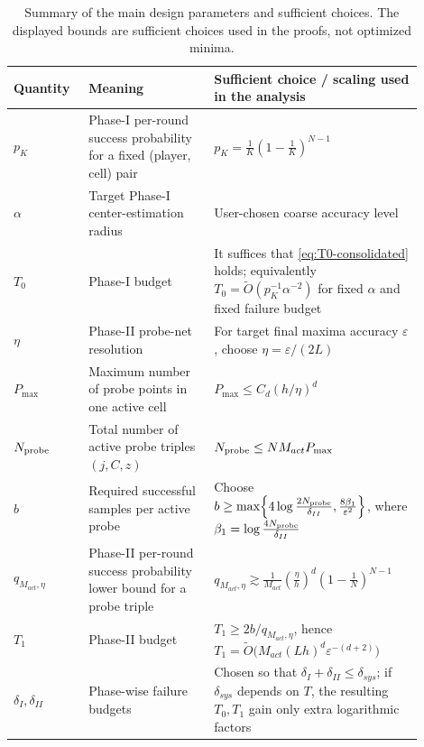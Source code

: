 \begin{table}[h]
\centering
\small
\renewcommand{\arraystretch}{1.15}
\begin{tabular}{|p{0.16\linewidth}|p{0.28\linewidth}|p{0.46\linewidth}|}
\hline
Quantity & Meaning & Sufficient choice / scaling used in the analysis \\
\hline
\(p_K\) & Phase-I per-round success probability for a fixed (player, cell) pair & \(p_K=\frac{1}{K}\left(1-\frac{1}{K}\right)^{N-1}\) \\
\hline
\(\alpha\) & Target Phase-I center-estimation radius & User-chosen coarse accuracy level \\
\hline
\(T_0\) & Phase-I budget & It suffices that \eqref{eq:T0-consolidated} holds; equivalently \(T_0=\tilde O(p_K^{-1}\alpha^{-2})\) for fixed \(\alpha\) and fixed failure budget \\
\hline
\(\eta\) & Phase-II probe-net resolution & For target final maxima accuracy \(\varepsilon\), choose \(\eta=\varepsilon/(2L)\) \\
\hline
\(P_{\max}\) & Maximum number of probe points in one active cell & \(P_{\max}\le C_d (h/\eta)^d\) \\
\hline
\(N_{\text{probe}}\) & Total number of active probe triples \((j,C,z)\) & \(N_{\text{probe}} \le N M_{act} P_{\max}\) \\
\hline
\(b\) & Required successful samples per active probe & Choose \(b \ge \max\!\left\{4\log\frac{2N_{\text{probe}}}{\delta_{II}}, \frac{8\beta_1}{\varepsilon^2}\right\}\), where \(\beta_1=\log\frac{4N_{\text{probe}}}{\delta_{II}}\) \\
\hline
\(q_{M_{act},\eta}\) & Phase-II per-round success probability lower bound for a probe triple & \(q_{M_{act},\eta} \gtrsim \frac{1}{M_{act}}\left(\frac{\eta}{h}\right)^d \left(1-\frac{1}{N}\right)^{N-1}\) \\
\hline
\(T_1\) & Phase-II budget & \(T_1 \ge 2b/q_{M_{act},\eta}\), hence \(T_1=\tilde O\!\big(M_{act}(Lh)^d\varepsilon^{-(d+2)}\big)\) \\
\hline
\(\delta_I,\delta_{II}\) & Phase-wise failure budgets & Chosen so that \(\delta_I+\delta_{II}\le \delta_{sys}\); if \(\delta_{sys}\) depends on \(T\), the resulting \(T_0,T_1\) gain only extra logarithmic factors \\
\hline
\end{tabular}
\caption{Summary of the main design parameters and sufficient choices. The displayed bounds are sufficient choices used in the proofs, not optimized minima.}
\label{tab:param-summary}
\end{table}


